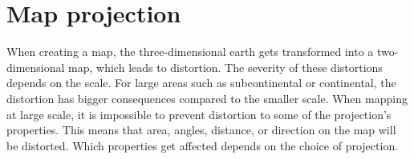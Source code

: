 \section{Map projection}\label{ProjectionTheory}
When creating a map, the three-dimensional earth gets transformed into a two-dimensional map, which leads to distortion. The severity of these distortions depends on the scale. For large areas such as subcontinental or continental, the distortion has bigger consequences compared to the smaller scale. When mapping at large scale, it is impossible to prevent distortion to some of the projection’s properties. This means that area, angles, distance, or direction on the map will be distorted. Which properties get affected depends on the choice of projection. %

%
%
%
%
















